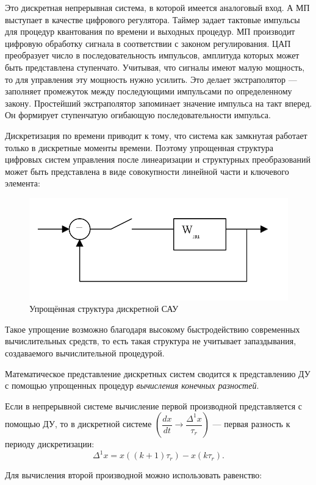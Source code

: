 \documentclass[unicode, 12pt, a4paper, oneside]{article}
\begin{document}
Это дискретная непрерывная система, в которой имеется аналоговый вход. А МП выступает в качестве цифрового регулятора. Таймер задает тактовые импульсы для процедур квантования по времени и выходных процедур. МП производит цифровую обработку сигнала в соответствии с законом регулирования. ЦАП преобразует число в последовательность импульсов, амплитуда которых может быть представлена ступенчато. Учитывая, что сигналы имеют малую мощность, то для управления эту мощность нужно усилить. Это делает экстраполятор --- заполняет промежуток между последующими импульсами по определенному закону. Простейший экстраполятор запоминает значение импульса на такт вперед. Он формирует ступенчатую огибающую последовательности импульса.

Дискретизация по времени приводит к тому, что система как замкнутая работает только в дискретные моменты времени. Поэтому упрощенная структура цифровых систем управления после линеаризации и структурных преобразований может быть представлена в виде совокупности линейной части и ключевого элемента:

\begin{figure}[H]
\centering
\includegraphics[width=0.5\linewidth]{21_dicret_struct_small.png}
\caption{Упрощённая структура дискретной САУ}
\label{fig:21_dicret_struct_small}
\end{figure}

Такое упрощение возможно благодаря высокому быстродействию современных вычислительных средств, то есть такая структура не учитывает запаздывания, создаваемого вычислительной процедурой.

Математическое представление дискретных систем сводится к представлению ДУ с помощью упрощенных процедур \textit{вычисления конечных разностей}.

Если в непрерывной системе вычисление первой производной представляется с помощью ДУ, то в дискретной системе $ \left( \dfrac{dx}{dt} \rightarrow \dfrac{\Delta^1x}{\tau_r} \right)  $  --- первая разность к периоду дискретизации:
\begin{equation}
\Delta^1x = x((k + 1)\tau_r) - x(k\tau_r).
\end{equation}

Для вычисления второй производной можно использовать равенство:
\end{document}

